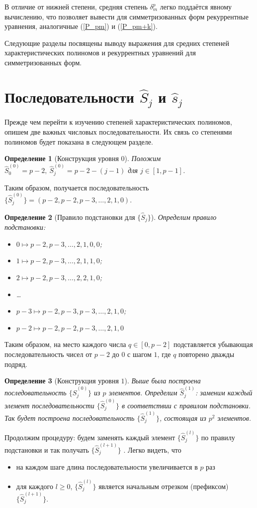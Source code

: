 \documentclass[14pt, a4paper, russian]{report}
\newtheorem{definition}{\indent Определение}
\begin{document}
В отличие от нижней степени, средняя степень $\delta_m^p$ легко поддаётся явному вычислению, что позволяет вывести для симметризованных форм рекуррентные уравнения, аналогичные (\ref{P_pm}) и (\ref{P_pm+k}).

Следующие разделы посвящены выводу выражения для средних степеней характеристических полиномов и рекуррентных уравнений для симметризованных форм.

\section{Последовательности $\hat{S}_j$ и $\hat{s}_j$}
Прежде чем перейти к изучению степеней характеристических полиномов, опишем две важных числовых последовательности. Их связь со степенями полиномов будет показана в следующем разделе.

\begin{definition}[Конструкция уровня $0$]
Положим $\hat{S}_0^{(0)} = p-2,\ \hat{S}_j^{(0)} = p-2-(j-1)$ для $j \in [1, p-1]$.
\end{definition}
Таким образом, получается последовательность $\{ \hat{S}_j^{(0)}\} = (p-2, p-2, p-3, \ldots, 2, 1, 0)$. 
\begin{definition} [Правило подстановки для $\{\hat{S}_j\}$]
Определим правило подстановки:
\begin{itemize}
 \item $0 \mapsto p-2, p-3, \ldots, 2, 1, 0, 0$;
 \item $1 \mapsto p-2, p-3, \ldots, 2, 1, 1, 0$;
 \item $2 \mapsto p-2, p-3, \ldots, 2, 2, 1, 0$;
 \item \ldots
 \item $p-3 \mapsto p-2, p-3, p-3, \ldots, 2, 1, 0$;
 \item $p-2 \mapsto p-2, p-2, p-3, \ldots, 2, 1, 0$
 \end{itemize}
\end{definition}
Таким образом, на место каждого числа $q \in [0, p-2]$ подставляется убывающая последовательность чисел от $p-2$ до $0$ с шагом $1$, где $q$ повторено дважды подряд.

\begin{definition}[Конструкция уровня $1$]\label{tier1}
Выше была построена последовательность $\{ \hat{S}_j^{(0)}\}$  из $p$ элементов. Определим 
$\hat{S}_j^{(1)}$: заменим каждый элемент последовательности $\{ \hat{S}_j^{(0)}\}$ в соответствии с правилом подстановки. Так будет построена последовательность $\{\hat{S}_j^{(1)}\}$, состоящая из $p^2$ элементов.
\end{definition}
Продолжим процедуру: будем заменять каждый элемент $\{ \hat{S}_j^{(l)}\}$ по правилу подстановки и так получать $\{ \hat{S}_j^{(l+1)}\}$ . Легко видеть, что
\begin{itemize}
\item на каждом шаге длина последовательности увеличивается в $p$ раз
\item для каждого $l \ge 0$,  $\{ \hat{S}_j^{(l)}\}$ является начальным отрезком (префиксом) $\{ \hat{S}_j^{(l+1)}\}$.
\end{itemize}
\end{document}
